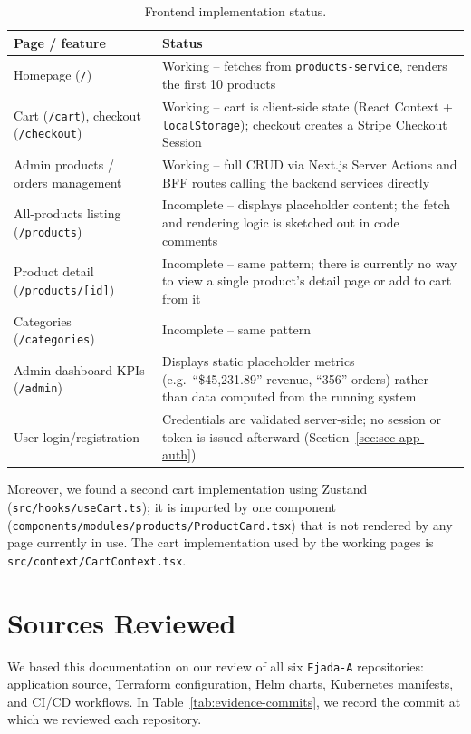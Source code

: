 \begin{table}[H]
\centering
\caption{Frontend implementation status.}
\label{tab:frontend-status}
\footnotesize
\renewcommand{\arraystretch}{0.85}
\begin{tabularx}{\textwidth}{>{\raggedright\arraybackslash}p{4.4cm}
                >{\raggedright\arraybackslash}X}
\toprule
\textbf{Page / feature} & \textbf{Status} \\
\midrule
Homepage (\texttt{/}) & Working -- fetches from \texttt{products-service}, renders the first 10 products \\
Cart (\texttt{/cart}), checkout (\texttt{/checkout}) & Working -- cart is client-side state (React Context + \texttt{localStorage}); checkout creates a Stripe Checkout Session \\
Admin products / orders management & Working -- full CRUD via Next.js Server Actions and BFF routes calling the backend services directly \\
All-products listing (\texttt{/products}) & Incomplete -- displays placeholder content; the fetch and rendering logic is sketched out in code comments \\
Product detail (\texttt{/products/[id]}) & Incomplete -- same pattern; there is currently no way to view a single product's detail page or add to cart from it \\
Categories (\texttt{/categories}) & Incomplete -- same pattern \\
Admin dashboard KPIs (\texttt{/admin}) & Displays static placeholder metrics (e.g.\ ``\$45,231.89'' revenue, ``356'' orders) rather than data computed from the running system \\
User login/registration & Credentials are validated server-side; no session or token is issued afterward (Section~\ref{sec:sec-app-auth}) \\
\bottomrule
\end{tabularx}
\renewcommand{\arraystretch}{1}
\end{table}

Moreover, we found a second cart implementation using Zustand
(\texttt{src/\allowbreak hooks/\allowbreak useCart.ts}); it is imported by one component
(\texttt{components/\allowbreak modules/\allowbreak products/\allowbreak ProductCard.tsx}) that is not rendered by any
page currently in use. The cart implementation used by the working pages is
\texttt{src/context/CartContext.tsx}.

\section{Sources Reviewed}\label{sec:validation-approach}
\label{sec:quant-comparative-scenario}
We based this documentation on our review of all six \texttt{Ejada-A} repositories:
application source, Terraform configuration, Helm charts, Kubernetes manifests,
and CI/CD workflows. In Table~\ref{tab:evidence-commits}, we record the commit at
which we reviewed each repository.

